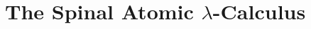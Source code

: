 \documentclass[a4paper,UKenglish,cleveref, autoref]{lipics-v2019}
\newcommand{\lamrule}{\lambda}
\begin{document}
%
%


\section{The Spinal Atomic $\lambda$-Calculus}
\end{document}
